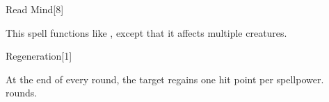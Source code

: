 \begin{spellsection}[Mass]{Read Mind}[8]
    \begin{spellheader}
    \end{spellheader}
    \begin{spellcontent}
        \begin{spelltargetinginfo}
        \end{spelltargetinginfo}
        \begin{spelleffects}
            \spellspecial This spell functions like , except that it affects multiple creatures.
        \end{spelleffects}
    \end{spellcontent}
    \begin{spellfooter}
        \miscastexplode
    \end{spellfooter}
\end{spellsection}

\begin{spellsection}[Lesser]{Regeneration}[1]
    \begin{spellheader}
    \end{spellheader}
    \begin{spellcontent}
        \begin{spelltargetinginfo}
        \end{spelltargetinginfo}
        \begin{spelleffects}
            \spelleffect At the end of every round, the target regains one hit point per spellpower.
             rounds.
        \end{spelleffects}
    \end{spellcontent}
    \begin{spellfooter}
        \miscastexplode
    \end{spellfooter}
\end{spellsection}

